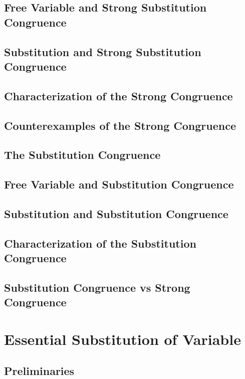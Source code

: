 \documentclass{report}
\begin{document}
    \subsection{Free Variable and Strong Substitution Congruence}
    \subsection{Substitution and Strong Substitution Congruence}
    \subsection{Characterization of the Strong Congruence}
    \subsection{Counterexamples of the Strong Congruence}
    \subsection{The Substitution Congruence}
    \subsection{Free Variable and Substitution Congruence}
    \subsection{Substitution and Substitution Congruence}
    \subsection{Characterization of the Substitution Congruence}
    \subsection{Substitution Congruence vs Strong Congruence}
\section{Essential Substitution of Variable}
    \subsection{Preliminaries}
\end{document}
